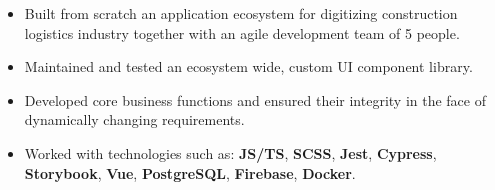 \documentclass[11pt,a4paper]{altacv}
\begin{document}
 \vspace{7mm}

\begin{fullwidth}
\makecvheader
\end{fullwidth}



\begin{comment}
\cvsection[page1sidebar]{Summary}
\begin{justify}
I am a senior Computer Science major currently working on my Bachelor Thesis, while  pursuing master's degree in CS well as deepening my experience in web development at a Berlin-based Start-up Kamioni. I complement my skills in software development with strong interest in data science. My aim is to become a cross field expert, who can not only rely on existing solutions, but also creates own ones in order to leverage the company's effectiveness.
\end{justify}
\end{comment}
\begin{itemize}
\item Built from scratch an application ecosystem for digitizing construction logistics industry together with an agile development team of 5 people.
\item Maintained and tested an ecosystem wide, custom UI component library.
\item Developed core business functions and ensured their integrity in the face of dynamically changing requirements. 
\item Worked with technologies such as: \textbf{JS/TS}, \textbf{SCSS}, \textbf{Jest}, \textbf{Cypress}, \textbf{Storybook}, \textbf{Vue}, \textbf{PostgreSQL}, \textbf{Firebase}, \textbf{Docker}.
\end{itemize}
\end{document}
